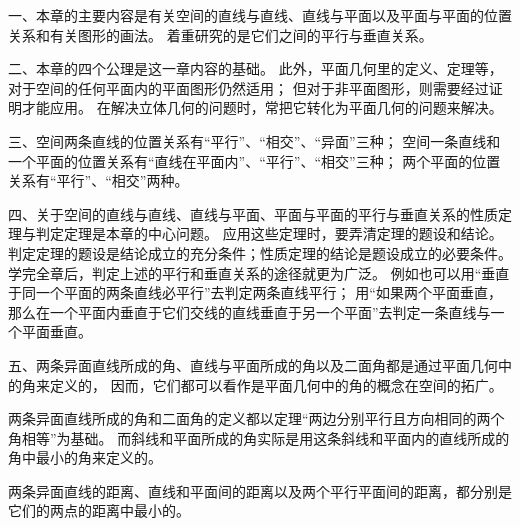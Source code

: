 \xiaojie

一、本章的主要内容是有关空间的直线与直线、直线与平面以及平面与平面的位置关系和有关图形的画法。
着重研究的是它们之间的平行与垂直关系。


二、本章的四个公理是这一章内容的基础。
此外，平面几何里的定义、定理等，对于空间的任何平面内的平面图形仍然适用；
但对于非平面图形，则需要经过证明才能应用。
在解决立体几何的问题时，常把它转化为平面几何的问题来解决。


三、空间两条直线的位置关系有“平行”、“相交”、“异面”三种；
空间一条直线和一个平面的位置关系有“直线在平面内”、“平行”、“相交”三种；
两个平面的位置关系有“平行”、“相交”两种。


四、关于空间的直线与直线、直线与平面、平面与平面的平行与垂直关系的性质定理与判定定理是本章的中心问题。
应用这些定理时，要弄清定理的题设和结论。
判定定理的题设是结论成立的充分条件；性质定理的结论是题设成立的必要条件。
学完全章后，判定上述的平行和垂直关系的途径就更为广泛。
例如也可以用“垂直于同一个平面的两条直线必平行”去判定两条直线平行；
用“如果两个平面垂直，那么在一个平面内垂直于它们交线的直线垂直于另一个平面”去判定一条直线与一个平面垂直。


五、两条异面直线所成的角、直线与平面所成的角以及二面角都是通过平面几何中的角来定义的，
因而，它们都可以看作是平面几何中的角的概念在空间的拓广。

两条异面直线所成的角和二面角的定义都以定理“两边分别平行且方向相同的两个角相等”为基础。
而斜线和平面所成的角实际是用这条斜线和平面内的直线所成的角中最小的角来定义的。

两条异面直线的距离、直线和平面间的距离以及两个平行平面间的距离，都分别是它们的两点的距离中最小的。


